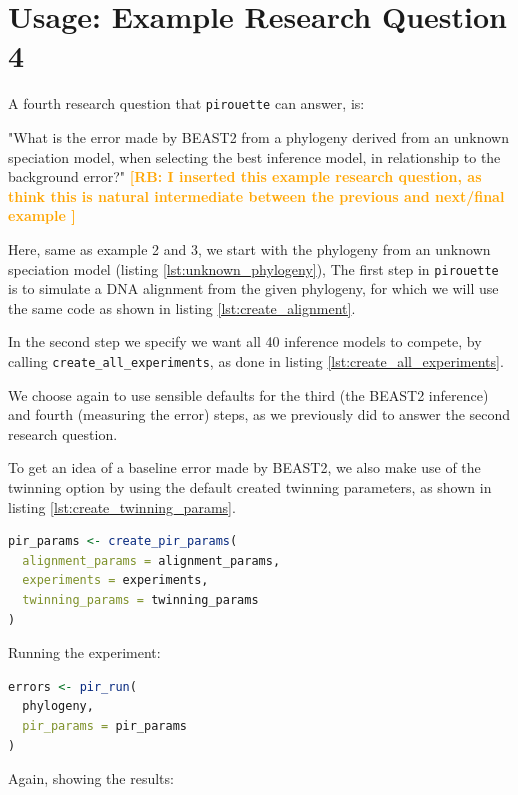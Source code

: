 \documentclass{article}
\newcommand{\richel}[1]{\textcolor{orange}{\textbf{[RB: #1]}}}
\begin{document}
\section{Usage: Example Research Question 4}

A fourth research question that \verb;pirouette; can answer, is:

"What is the error made by BEAST2 from a phylogeny 
derived from an unknown speciation model,
when selecting the best inference model, 
in relationship to the background error?"
\richel{
  I inserted this example research question, 
  as think this is natural intermediate between the 
  previous and next/final example
}

Here, same as example 2 and 3, we start with the phylogeny 
from an unknown speciation model (listing \ref{lst:unknown_phylogeny}), 
The first step in \verb;pirouette; is to simulate a DNA alignment 
from the given phylogeny, for which we will use the same code 
as shown in listing \ref{lst:create_alignment}.

In the second step we specify we want all 
40 inference models to compete, by 
calling \verb;create_all_experiments;,
as done in listing \ref{lst:create_all_experiments}.

We choose again to use sensible defaults for the third (the BEAST2 inference) 
and fourth (measuring the error) steps, 
as we previously did to answer the second research question. 

To get an idea of a baseline error made by BEAST2, 
we also make use of the twinning option by using the
default created twinning parameters, as shown in 
listing \ref{lst:create_twinning_params}.

\begin{lstlisting}[language=R, floatplacement=ht, frame=single]
pir_params <- create_pir_params(
  alignment_params = alignment_params,
  experiments = experiments,
  twinning_params = twinning_params
)
\end{lstlisting}

Running the experiment:

\begin{lstlisting}[language=R, floatplacement=ht, frame=single]
errors <- pir_run(
  phylogeny,
  pir_params = pir_params
)
\end{lstlisting}

Again, showing the results:
\end{document}
